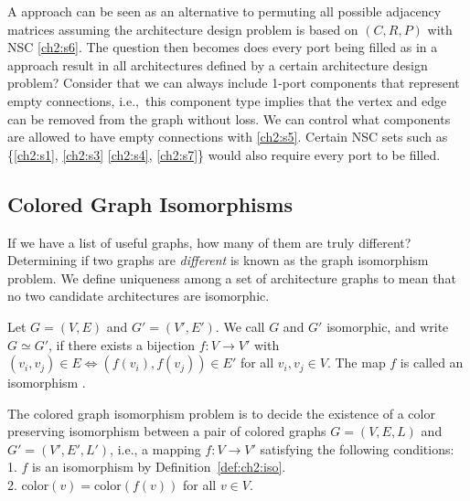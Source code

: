 

A \mypm{} approach can be seen as an alternative to permuting all possible adjacency matrices assuming the architecture design problem is based on $(C,R,P)$ with NSC \ref{ch2:s6}. The question then becomes does every port being filled as in a \mypm{} approach result in all architectures defined by a certain architecture design problem?
Consider that we can always include 1-port components that represent empty connections, i.e.,~this component type implies that the vertex and edge can be removed from the graph without loss. We can control what components are allowed to have empty connections with \ref{ch2:s5}. Certain NSC sets such as \{\ref{ch2:s1}, \ref{ch2:s3} \ref{ch2:s4}, \ref{ch2:s7}\} would also require every port to be filled.

\subsection{Colored Graph Isomorphisms}

If we have a list of useful graphs, how many of them are truly different? Determining if two graphs are \textit{different} is known as the graph isomorphism problem. We define uniqueness among a set of architecture graphs to mean that no two candidate architectures are isomorphic.

\begin{definition}[Isomorphism] \label{def:ch2:iso}
Let $G = (V,E)$ and $G' = (V',E')$. We call $G$ and $G'$ isomorphic, and write $G \simeq G'$, if there exists a bijection $f: V\to V'$ with $(v_i,v_j) \in E \Leftrightarrow (f(v_i), f(v_j)) \in E'$ for all $v_i,v_j \in V$. The map $f$ is called an isomorphism \cite{Diestel2000a}.
\end{definition}

\begin{definition} \label{def:ch2:ciso}
The colored graph isomorphism problem is to decide the existence of a color preserving isomorphism between a pair of colored graphs $G = (V, E, L)$ and $G' = (V',E',L')$, i.e., a mapping $f: V \to V'$ satisfying the following conditions: \\
1. $f$ is an isomorphism by Definition~\ref{def:ch2:iso}. \\
2. $\mathrm{color}(v) = \mathrm{color}(f(v))$ for all $v \in V$.
\end{definition}

